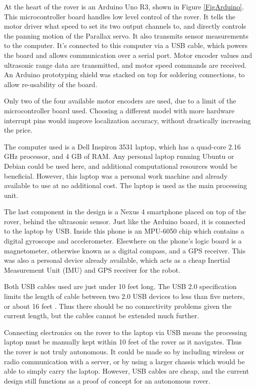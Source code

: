 At the heart of the rover is an Arduino Uno R3, shown in Figure \ref{FigArduino}. This microcontroller board handles low level control of the rover. It tells the motor driver what speed to set its two output channels to, and directly controls the panning motion of the Parallax servo. It also transmits sensor measurements to the computer. It's connected to this computer via a USB cable, which powers the board and allows communication over a serial port. Motor encoder values and ultrasonic range data are transmitted, and motor speed commands are received. An Arduino prototyping shield was stacked on top for soldering connections, to allow re-usability of the board.

Only two of the four available motor encoders are used, due to a limit of the microcontroller board used. Choosing a different model with more hardware interrupt pins would improve localization accuracy, without drastically increasing the price.

The computer used is a Dell Inspiron 3531 laptop, which has a quad-core 2.16 GHz processor, and 4 GB of RAM. Any personal laptop running Ubuntu or Debian could be used here, and additional computational resources would be beneficial. However, this laptop was a personal work machine and already available to use at no additional cost. The laptop is used as the main processing unit.

The last component in the design is a Nexus 4 smartphone placed on top of the rover, behind the ultrasonic sensor. Just like the Arduino board, it is connected to the laptop by USB. Inside this phone is an MPU-6050 chip which contains a digital gyroscope and accelerometer. Elsewhere on the phone's logic board is a magnetometer, otherwise known as a digital compass, and a GPS receiver. This was also a personal device already available, which acts as a cheap Inertial Measurement Unit (IMU) and GPS receiver for the robot.

Both USB cables used are just under 10 feet long. The USB 2.0 specification limits the length of cable between two 2.0 USB devices to less than five meters, or about 16 feet \cite{usbForum}. Thus there should be no connectivity problems given the current length, but the cables cannot be extended much further. 

Connecting electronics on the rover to the laptop via USB means the processing laptop must be manually kept within 10 feet of the rover as it navigates. Thus the rover is not truly autonomous. It could be made so by including wireless or radio communication with a server, or by using a larger chassis which would be able to simply carry the laptop. However, USB cables are cheap, and the current design still functions as a proof of concept for an autonomous rover.

